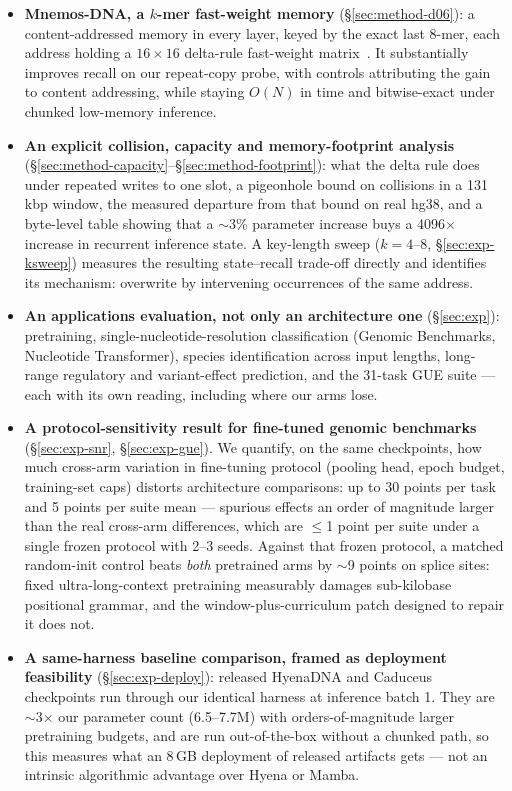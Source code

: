 \documentclass[11pt]{article}
\theoremstyle{plain}
\begin{document}
\begin{itemize}
\item \textbf{Mnemos-DNA, a $k$-mer fast-weight memory} (\S\ref{sec:method-d06}): a content-addressed
memory in every layer, keyed by the exact last 8-mer, each address holding a $16\times16$
delta-rule fast-weight matrix~\cite{schlag2021linear}. It substantially improves recall on our
repeat-copy probe, with controls attributing the gain to content addressing, while staying $O(N)$ in time and bitwise-exact under chunked low-memory inference.
\item \textbf{An explicit collision, capacity and memory-footprint analysis}
(\S\ref{sec:method-capacity}--\S\ref{sec:method-footprint}): what the delta rule does under
repeated writes to one slot, a pigeonhole bound on collisions in a 131\,kbp window, the measured
departure from that bound on real hg38, and a byte-level table showing that a $\sim$3\% parameter
increase buys a 4096$\times$ increase in recurrent inference state. A key-length sweep
($k{=}4$--$8$, \S\ref{sec:exp-ksweep}) measures the resulting state--recall trade-off directly
and identifies its mechanism: overwrite by intervening occurrences of the same address.
\item \textbf{An applications evaluation, not only an architecture one} (\S\ref{sec:exp}):
pretraining, single-nucleotide-resolution classification (Genomic Benchmarks, Nucleotide
Transformer), species identification across input lengths, long-range regulatory and
variant-effect prediction, and the 31-task GUE suite --- each with its own reading, including
where our arms lose.
\item \textbf{A protocol-sensitivity result for fine-tuned genomic benchmarks}
(\S\ref{sec:exp-snr}, \S\ref{sec:exp-gue}). We quantify, on the same checkpoints, how much
cross-arm variation in fine-tuning protocol (pooling head, epoch budget, training-set caps)
distorts architecture comparisons: up to 30 points per task and 5 points per suite mean ---
spurious effects an order of magnitude larger than the real cross-arm differences, which are
$\le$1 point per suite under a single frozen protocol with 2--3 seeds. Against that frozen
protocol, a matched random-init control beats \emph{both} pretrained arms by $\sim$9 points on
splice sites: fixed ultra-long-context pretraining measurably damages sub-kilobase positional
grammar, and the window-plus-curriculum patch designed to repair it does not.
\item \textbf{A same-harness baseline comparison, framed as deployment feasibility}
(\S\ref{sec:exp-deploy}): released HyenaDNA and Caduceus checkpoints run through our identical
harness at inference batch 1. They are $\sim$3$\times$ our parameter count (6.5--7.7M) with
orders-of-magnitude larger pretraining budgets, and are run out-of-the-box without a chunked
path, so this measures what an 8\,GB deployment of released artifacts gets --- not an intrinsic
algorithmic advantage over Hyena or Mamba.
\end{itemize}
\end{document}
